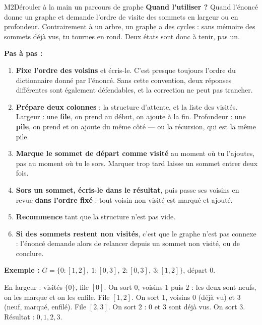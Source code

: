 \begin{fichemethode}{M2}{Dérouler à la main un parcours de graphe}
\textbf{Quand l'utiliser ?} Quand l'énoncé donne un graphe et demande l'ordre de visite des
sommets en largeur ou en profondeur. Contrairement à un arbre, un graphe a des cycles : sans
mémoire des sommets déjà vus, tu tournes en rond. Deux états sont donc à tenir, pas un.

\textbf{Pas à pas :}
\begin{enumerate}
  \item \textbf{Fixe l'ordre des voisins} et écris-le. C'est presque toujours l'ordre du
    dictionnaire donné par l'énoncé. Sans cette convention, deux réponses différentes sont
    également défendables, et la correction ne peut pas trancher.
  \item \textbf{Prépare deux colonnes} : la structure d'attente, et la liste des visités.
    Largeur : une \textbf{file}, on prend au début, on ajoute à la fin. Profondeur : une
    \textbf{pile}, on prend et on ajoute du même côté — ou la récursion, qui est la même pile.
  \item \textbf{Marque le sommet de départ comme visité} au moment où tu l'ajoutes, pas au
    moment où tu le sors. Marquer trop tard laisse un sommet entrer deux fois.
  \item \textbf{Sors un sommet, écris-le dans le résultat}, puis passe ses voisins en revue
    \textbf{dans l'ordre fixé} : tout voisin non visité est marqué et ajouté.
  \item \textbf{Recommence} tant que la structure n'est pas vide.
  \item \textbf{Si des sommets restent non visités}, c'est que le graphe n'est pas connexe :
    l'énoncé demande alors de relancer depuis un sommet non visité, ou de conclure.
\end{enumerate}

\textbf{Exemple :} $G = \{0: [1, 2],\ 1: [0, 3],\ 2: [0, 3],\ 3: [1, 2]\}$, départ $0$.

En largeur : visités $\{0\}$, file $[0]$. On sort $0$, voisins $1$ puis $2$ : les deux sont
neufs, on les marque et on les enfile. File $[1, 2]$. On sort $1$, voisins $0$ (déjà vu) et
$3$ (neuf, marqué, enfilé). File $[2, 3]$. On sort $2$ : $0$ et $3$ sont déjà vus. On sort
$3$. Résultat : $0, 1, 2, 3$.


\end{fichemethode}
